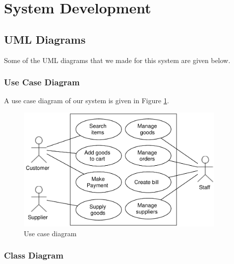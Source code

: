 \section{System Development}

\subsection{UML Diagrams}

Some of the UML diagrams that we made for this system are given below.

\subsubsection{Use Case Diagram}

A use case diagram of our system is given in Figure \ref{fig:use-case}.

\begin{figure}[h]\centering
  \includegraphics[width=4in]{fig/use-case}
  \caption{Use case diagram}\label{fig:use-case}
\end{figure}

\subsubsection{Class Diagram}

